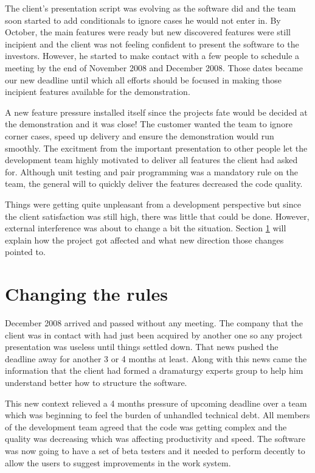 \documentclass[lnbip]{svmultln}
\begin{document}
The client's presentation script was evolving as the software did and
the team soon started to add conditionals to ignore cases he would not
enter in. By October, the main features were ready but new discovered
features were still incipient and the client was not feeling confident
to present the software to the investors. However, he started to make
contact with a few people to schedule a meeting by the end of November
2008 and December 2008. Those dates became our new deadline until
which all efforts should be focused in making those incipient features
available for the demonstration.

A new feature pressure installed itself since the projects fate would
be decided at the demonstration and it was close! The customer wanted
the team to ignore corner cases, speed up delivery and ensure the
demonstration would run smoothly. The excitment from the important
presentation to other people let the development team highly motivated
to deliver all features the client had asked for. Although unit
testing and pair programming was a mandatory rule on the team, the
general will to quickly deliver the features decreased the code
quality.

Things were getting quite unpleasant from a development perspective
but since the client satisfaction was still high, there was little
that could be done. However, external interference was about to change
a bit the situation. Section \ref{sec:changes} will explain how the
project got affected and what new direction those changes pointed to.

\section{Changing the rules}
\label{sec:changes}

December 2008 arrived and passed without any meeting. The company that
the client was in contact with had just been acquired by another one
so any project presentation was useless until things settled
down. That news pushed the deadline away for another 3 or 4 months at
least. Along with this news came the information that the client had
formed a dramaturgy experts group to help him understand better how to
structure the software.

This new context relieved a 4 months pressure of upcoming deadline
over a team which was beginning to feel the burden of unhandled
technical debt. All members of the development team agreed that the
code was getting complex and the quality was decreasing which was
affecting productivity and speed. The software was now going to have a
set of beta testers and it needed to perform decently to allow the
users to suggest improvements in the work system.
\end{document}
